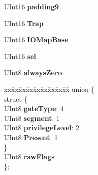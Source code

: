 \begin{DoxyCompactItemize}
U\+Int16 {\bfseries padding9}
\item 
\mbox{\label{struct____attribute_____ac4e982990a8ebd5322625e5c9caf84c4}} 
U\+Int16 {\bfseries Trap}
\item 
\mbox{\label{struct____attribute_____a5d07b69625c953ea654254d5b3b0a4b0}} 
U\+Int16 {\bfseries I\+O\+Map\+Base}
\item 
\mbox{\label{struct____attribute_____ae25be12dced8a7e295d2e576946704f0}} 
U\+Int16 {\bfseries sel}
\item 
\mbox{\label{struct____attribute_____a4d16d62ad0da0c8fb7baa716f5ec0afc}} 
U\+Int8 {\bfseries always\+Zero}
\item 
\mbox{\label{struct____attribute_____aa5deb3be2de290859342cc43c47bb77f}} 
\begin{tabbing}
xx\=xx\=xx\=xx\=xx\=xx\=xx\=xx\=xx\=\kill
union \{\\
\mbox{\label{union____attribute_____1_1_0D5_ae610ef72875dec8729302b4bbae62426}} 
\>struct \{\\
\>\>UInt8 {\bfseries gateType}: 4\\
\>\>UInt8 {\bfseries segment}: 1\\
\>\>UInt8 {\bfseries privilegeLevel}: 2\\
\>\>UInt8 {\bfseries Present}: 1\\
\>\} \\
\>UInt8 {\bfseries rawFlags}\\
\}; \\


\end{tabbing}
\end{DoxyCompactItemize}
